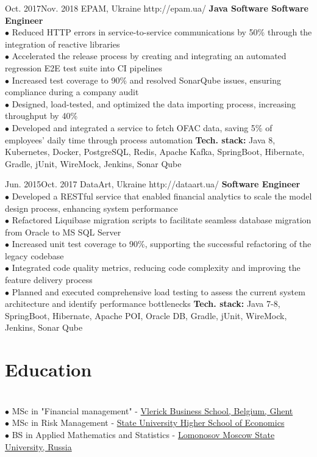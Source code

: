 \documentclass[10pt]{article} %
\begin{document}
\job
{Oct. 2017}{Nov. 2018}
{EPAM, Ukraine}
{http://epam.ua/}
{\textbf{Java Software Software Engineer}}
{
\textbf{}    
\\$\bullet$ Reduced HTTP errors in service-to-service communications by 50\% through the integration of reactive libraries
\\$\bullet$ Accelerated the release process by creating and integrating an automated regression E2E test suite into CI pipelines
\\$\bullet$ Increased test coverage to 90\% and resolved SonarQube issues, ensuring compliance during a company audit
\\$\bullet$ Designed, load-tested, and optimized the data importing process, increasing throughput by 40\%
\\$\bullet$ Developed and integrated a service to fetch OFAC data, saving 5\% of employees’ daily time through process automation
\vadjust{\vspace{4pt}}
\newline
\textbf{Tech. stack: }{Java 8, Kubernetes, Docker, PostgreSQL, Redis, Apache Kafka, SpringBoot, Hibernate, Gradle, jUnit, WireMock, Jenkins, Sonar Qube}  
 }

\job
{Jun. 2015}{Oct. 2017}
{DataArt, Ukraine}
{http://dataart.ua/}
{\textbf{Software Engineer}}
{
\textbf{}  
\\$\bullet$ Developed a RESTful service that enabled financial analytics to scale the model design process, enhancing system performance
\\$\bullet$ Refactored Liquibase migration scripts to facilitate seamless database migration from Oracle to MS SQL Server
\\$\bullet$ Increased unit test coverage to 90\%, supporting the successful refactoring of the legacy codebase
\\$\bullet$ Integrated code quality metrics, reducing code complexity and improving the feature delivery process
\\$\bullet$ Planned and executed comprehensive load testing to assess the current system architecture and identify performance bottlenecks
\vadjust{\vspace{4pt}}
\newline
\textbf{Tech. stack: }{Java 7-8, SpringBoot, Hibernate, Apache POI, Oracle DB, Gradle, jUnit, WireMock, Jenkins, Sonar Qube}  
 }
 
 \section{Education}
 {
 \textbf{}  
 \\$\bullet$ MSc in "Financial management"  - \href{https://www.vlerick.com/en}{Vlerick Business School, Belgium, Ghent}
\\$\bullet$  MSc in Risk Management  - \href{https://www.hse.ru}{State University  Higher School of Economics}
\\$\bullet$  BS in Applied Mathematics and Statistics - \href{http://www.msu.ru/en/}{Lomonosov Moscow State University, Russia}
 }
\end{document}
